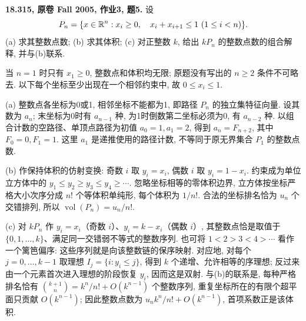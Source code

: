 \begin{exercise}\label{mit:18315-hw3-q5}
\textbf{18.315, 原卷 Fall 2005, 作业3, 题5.}
设
\[
P_n=\{x\in\R^n:x_i\ge0,\quad x_i+x_{i+1}\le1\ (1\le i<n)\}.
\]
(a) 求其整数点数; (b) 求其体积;
(c) 对正整数 $k$, 给出 $kP_n$ 的整数点数的组合解释, 并与(b)联系.
\end{exercise}
\begin{solution}
当 $n=1$ 时只有 $x_1\ge0$, 整数点和体积均无限;
原题没有写出的 $n\ge2$ 条件不可略去. 以下每个坐标至少出现在一个相邻约束中,
故 $0\le x_i\le1$.

(a) 整数点各坐标为0或1, 相邻坐标不能都为1,
即路径 $P_n$ 的独立集特征向量. 设其数为 $a_n$;
末坐标为0时有 $a_{n-1}$ 种, 为1时倒数第二坐标必须为0, 有 $a_{n-2}$ 种.
以组合计数的空路径、单顶点路径为初值 $a_0=1,a_1=2$,
得到 $a_n=F_{n+2}$, 其中 $F_0=0,F_1=1$.
这里 $a_1$ 是递推使用的路径计数, 不等同于原无界集合 $P_1$ 的整数点数.

(b) 作保持体积的仿射变换: 奇数 $i$ 取 $y_i=x_i$,
偶数 $i$ 取 $y_i=1-x_i$.
约束成为单位立方体中的
$y_1\le y_2\ge y_3\le y_4\ge\cdots$.
忽略坐标相等的零体积边界, 立方体按坐标严格大小次序分成 $n!$ 个等体积单纯形,
每个体积为 $1/n!$. 合法的坐标排名恰为 $u_n$ 个交错排列,
所以 $\operatorname{vol}(P_n)=u_n/n!$.

(c) 对 $kP_n$ 作 $y_i=x_i$（奇数 $i$）、$y_i=k-x_i$（偶数 $i$）,
其整数点恰是取值于 $\{0,1,\ldots,k\}$、满足同一交错弱不等式的整数序列.
也可将 $1<2>3<4>\cdots$ 看作一个篱笆偏序:
这些序列就是向该整数链的保序映射.
对应地, 对每个 $j=0,\ldots,k-1$ 取理想
$I_j=\{i:y_i\le j\}$, 得到 $k$ 个递增、允许相等的序理想;
反过来由一个元素首次进入理想的阶段恢复 $y_i$, 因而这是双射.
与(b)的联系是, 每种严格排名恰有 $\binom{k+1}{n}=k^n/n!+O(k^{n-1})$ 个整数序列,
重复坐标所在的有限个超平面只贡献 $O(k^{n-1})$;
因此整数点数为 $u_n k^n/n!+O(k^{n-1})$, 首项系数正是该体积.
\end{solution}
